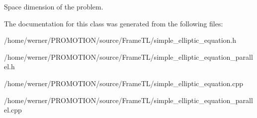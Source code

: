 Space dimension of the problem. 

The documentation for this class was generated from the following files:\begin{CompactItemize}
\item 
/home/werner/PROMOTION/source/FrameTL/simple\_\-elliptic\_\-equation.h\item 
/home/werner/PROMOTION/source/FrameTL/simple\_\-elliptic\_\-equation\_\-parallel.h\item 
/home/werner/PROMOTION/source/FrameTL/simple\_\-elliptic\_\-equation.cpp\item 
/home/werner/PROMOTION/source/FrameTL/simple\_\-elliptic\_\-equation\_\-parallel.cpp\end{CompactItemize}
